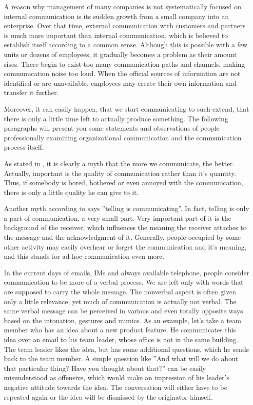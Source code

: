 \documentclass[11pt,singleside]{myfithesis2}
\begin{document}
A reason why management of many companies is not systematically focused on internal communication is its sudden growth from a small company into an enterprise. Over that time, external communication with customers and partners is much more important than internal communication, which is believed to establish itself according to a common sense. Although this is possible with a few units or dozens of employees, it gradually becomes a problem as their amount rises. There begin to exist too many communication paths and channels, making communication noise too loud. When the official sources of information are not identified or are unavailable, employees may create their own information and transfer it further.

Moreover, it can easily happen, that we start communicating to such extend, that there is only a little time left to actually produce something. The following paragraphs will present you some statements and observations of people professionally examining organizational communication and the communication process itself.

As stated in \cite{orgCommForSurvival}, it is clearly a myth that the more we communicate, the better. Actually, important is the quality of communication rather than it's quantity. Thus, if somebody is bored, bothered or even annoyed with the communication, there is only a little quality he can give to it.

Another myth according to \cite{orgCommForSurvival} says ''telling is communicating''. In fact, telling is only a part of communication, a very small part. Very important part of it is the background of the receiver, which influences the meaning the receiver attaches to the message and the acknowledgment of it. Generally, people occupied by some other activity may easily overhear or forget the communication and it's meaning, and this stands for ad-hoc communication even more.

In the current days of emails, IMs and always available telephone, people consider communication to be more of a verbal process. We are left only with words that are supposed to carry the whole message. The nonverbal aspect is often given only a little relevance, yet much of communication is actually not verbal. The same verbal message can be perceived in various and even totally opposite ways based on the intonation, gestures and mimics. As an example, let's take a team member who has an idea about a new product feature. He communicates this idea over an email to his team leader, whose office is not in the same building. The team leader likes the idea, but has some additional questions, which he sends back to the team member. A simple question like ''And what will we do about that particular thing? Have you thought about that?'' can be easily misunderstood as offensive, which would make an impression of his leader's negative attitude towards the idea. The conversation will either have to be repeated again or the idea will be dismissed by the originator himself.
\end{document}
